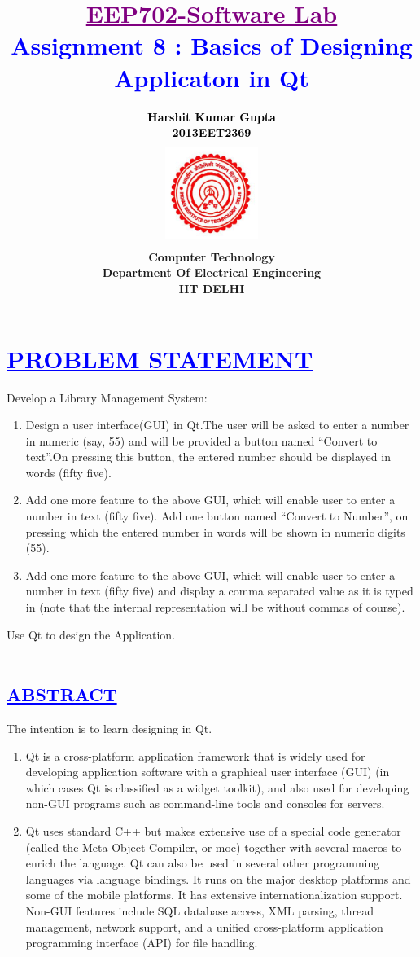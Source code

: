\documentclass[a4paper,12pt]{report}
\title{\bfseries\huge \textcolor{purple}{\underline {EEP702-Software Lab}} \\{\textcolor{blue}{Assignment 8 : Basics of Designing Applicaton in Qt}}}
\author{\bfseries\large\textcolor{black}  {Harshit Kumar Gupta}\\ {\textcolor{black} {2013EET2369 }}\\
\includegraphics[width=3cm,height=3.4cm]{iit.png}\\\noindent Computer Technology\\
\noindent Department Of Electrical Engineering\\IIT DELHI}
\begin{document}
\maketitle
\tableofcontents


\chapter{\textcolor{blue}{\underline {PROBLEM STATEMENT}}}
\noindent Develop a Library Management System:
\begin{enumerate}
\item Design a user interface(GUI) in Qt.The user will be asked to enter a number in numeric (say, 55) and will be provided a button named “Convert to text”.On pressing this button, the entered number should be displayed in words (fifty five).
\item Add one more feature to the above GUI, which will enable user to enter a number in text (fifty five). Add one button named “Convert  to Number”, on pressing which the entered number in words will be shown in numeric digits (55).
\item Add one more feature to the above GUI, which will enable user to enter a number in text (fifty five) and display a comma separated value as it is typed in (note that the internal representation will be without commas of course).
\end{enumerate}

\noindent Use Qt to design the Application.\\\\


\begin{center}
\chapter{\textcolor{blue}{\underline {ABSTRACT}}}
\end{center}
\noindent The intention is to learn designing in Qt.

\begin{enumerate}
\item Qt is a cross-platform application framework that is widely used for developing application software with a graphical user interface (GUI) (in which cases Qt is classified as a widget toolkit), and also used for developing non-GUI programs such as command-line tools and consoles for servers.
\item Qt uses standard C++ but makes extensive use of a special code generator (called the Meta Object Compiler, or moc) together with several macros to enrich the language. Qt can also be used in several other programming languages via language bindings. It runs on the major desktop platforms and some of the mobile platforms. It has extensive internationalization support. Non-GUI features include SQL database access, XML parsing, thread management, network support, and a unified cross-platform application programming interface (API) for file handling.
\end{enumerate}
\end{document}
